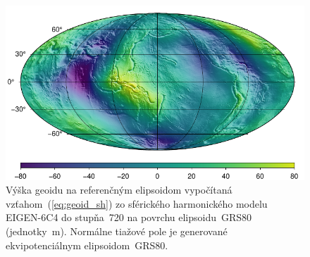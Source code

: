 \documentclass[a4paper, 12pt]{book}
\begin{document}
\begin{figure}
\centering
\includegraphics{./fig-geoid-ggm.pdf}
\caption{Výška geoidu na referenčným elipsoidom vypočítaná 
vzťahom~(\ref{eq:geoid_sh}) zo sférického harmonického modelu EIGEN-6C4 do 
stupňa~720 na povrchu elipsoidu~GRS80 (jednotky~m).  Normálne tiažové pole je 
generované ekvipotenciálnym elipsoidom~GRS80.}
\label{fig:geoid_ggm}
\end{figure}
\end{document}
